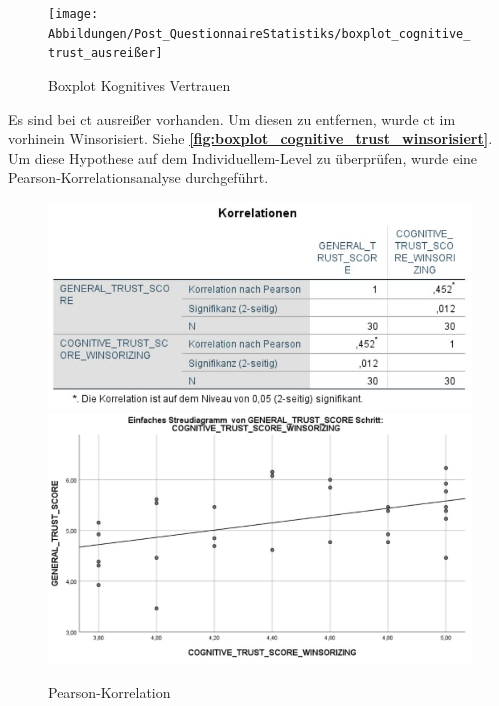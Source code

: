 \documentclass[a4paper,11pt]{article}%
\renewcommand{\\}{\vspace*{0.5\baselineskip} \newline}
\begin{document}
\begin{figure}[H]
\centering
		\begin{footnotesize}
			\texttt{[image: Abbildungen/Post\_QuestionnaireStatistiks/boxplot\_cognitive\_trust\_ausreißer]}\\
			\caption{Boxplot Kognitives Vertrauen}
			\label{fig:boxplot_cognitive_trust_ausreißer}
		\end{footnotesize}
	\end{figure}	

Es sind bei \ac{ct} ausreißer vorhanden. Um diesen zu entfernen, wurde \ac{ct} im vorhinein Winsorisiert. Siehe \textbf{\autoref{fig:boxplot_cognitive_trust_winsorisiert}}. 
Um diese Hypothese auf dem Individuellem-Level zu überprüfen, wurde eine Pearson-Korrelationsanalyse durchgeführt. 

\begin{figure}[H]
\centering
		\begin{footnotesize}
			\includegraphics[scale=0.8]{Abbildungen/Post_QuestionnaireStatistiks/pearson_korrelation_general_cognitive}\\
			\includegraphics[scale=0.5]{Abbildungen/Post_QuestionnaireStatistiks/diagramm_pearson_korrelation_general_cognitive}\\
			\caption{Pearson-Korrelation}
			\label{fig:boxplot_cognitive_trust_ausreißer}
		\end{footnotesize}
	\end{figure}	
\end{document}
